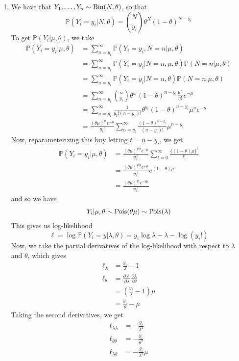\documentclass[letterpaper,10pt]{amsart}
\newcommand{\p}[1]{\mathbb{P}\!\left(#1\right)}
\newcommand{\Bin}{\textnormal{Bin}}
\newcommand{\Pois}{\textnormal{Pois}}
\begin{document}
\begin{enumerate}[{1}.1]
\item
We have that $Y_1, \ldots, Y_n \sim \Bin(N, \theta)$, so that
\[\p{Y_i = y_i | N, \theta} = \binom{N}{y_i} \theta^N (1-\theta)^{N - y_i}\]
To get $\p{Y_i | \mu, \theta}$, we take
\begin{align*}
\p{Y_i = y_i | \mu, \theta} &= \sum_{n=y_i}^\infty \p{Y_i = y_i, N=n | \mu, \theta}\\
&= \sum_{n=y_i}^\infty \p{Y_i = y_i | N=n, \mu, \theta} \p{N=n | \mu, \theta}\\
&= \sum_{n=y_i}^\infty \p{Y_i = y_i | N=n, \theta} \p{N=n | \mu, \theta}\\
&= \sum_{n=y_i}^\infty \binom{n}{y_i}\theta^{y_i} (1-\theta)^{n-y_i} \frac{\mu^n}{n!}e^{-\mu}\\
&= \sum_{n=y_i}^\infty \frac{1}{y_I! (n - y_i)!} \theta^{y_i} (1-\theta)^{n - y_i} \mu^n e^{-\mu}\\
&= \frac{(\theta \mu)^{y_i} e^{-\mu}}{y_i!} \sum_{n = y_i}^\infty \frac{(1-\theta)^{n-y_i}}{(n-y_i)!}\mu^{n-y_i}
\end{align*}
Now, reparameterizing this buy letting $t = n - y_i$, we get
\begin{align*}
\p{Y_i = y_i | \mu, \theta} &= \frac{(\theta \mu)^{y)i} e^{-\mu}}{y_i!} \sum_{t=0}^\infty \frac{\{(1-\theta)\mu\}^t}{t!}\\
&= \frac{(\theta \mu)^{y)i} e^{-\mu}}{y_i!} e^{(1-\theta)\mu}\\
&= \frac{(\theta \mu)^{y_i} e^{-\theta \mu}}{y_i!}
\end{align*}
and so we have 
\[Y_i | \mu, \theta \sim \Pois(\theta \mu) \sim \Pois(\lambda)\]
This gives us log-likelihood
\[\ell = \log \p{Y_i = y | \lambda, \theta} =  y_i \log \lambda - \lambda - \log(y_i!)\]
Now, we take the partial derivatives of the log-likelihood with respect to $\lambda$ and $\theta$, which gives
\begin{align*}
\ell_\lambda &= \frac{y_i}{\lambda} - 1\\
\ell_\theta &= \frac{\partial \ell }{\partial \lambda} \frac{\partial \lambda}{\partial \theta}\\
&= \left(\frac{y_i}{\lambda}-1\right) \mu\\
&= \frac{y_i}{\theta} - \mu
\end{align*}
Taking the second derivatives, we get
\begin{align*}
\ell_{\lambda \lambda} &= -\frac{y_i}{\lambda^2}\\
\ell_{\theta \theta} &= -\frac{y_i}{\theta^2}\\
\ell_{\lambda \theta} &= -\frac{y_i}{\lambda^2} \mu\\

\end{align*}
\end{enumerate}
\end{document}
